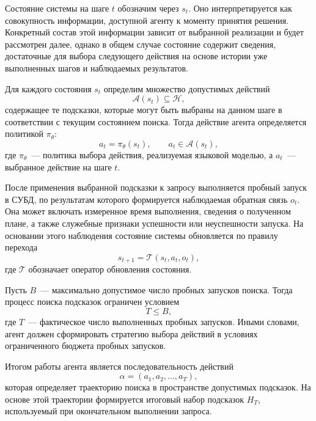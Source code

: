 Состояние системы на шаге $t$ обозначим через $s_t$. Оно интерпретируется как совокупность информации, доступной агенту к моменту принятия решения. Конкретный состав этой информации зависит от выбранной реализации и будет рассмотрен далее, однако в общем случае состояние содержит сведения, достаточные для выбора следующего действия на основе истории уже выполненных шагов и наблюдаемых результатов.

Для каждого состояния $s_t$ определим множество допустимых действий
\begin{equation}
    \label{eq:available_actions}
    \mathcal{A}(s_t) \subseteq \mathcal{H},
\end{equation}
содержащее те подсказки, которые могут быть выбраны на данном шаге в соответствии с текущим состоянием поиска. Тогда действие агента определяется политикой $\pi_\theta$:
\begin{equation}
    \label{eq:policy_action}
    a_t = \pi_\theta(s_t), \qquad a_t \in \mathcal{A}(s_t),
\end{equation}
где $\pi_\theta$~--- политика выбора действия, реализуемая языковой моделью, а $a_t$~--- выбранное действие на шаге $t$.

После применения выбранной подсказки к запросу выполняется пробный запуск в СУБД, по результатам которого формируется наблюдаемая обратная связь $o_t$. Она может включать измеренное время выполнения, сведения о полученном плане, а также служебные признаки успешности или неуспешности запуска. На основании этого наблюдения состояние системы обновляется по правилу перехода
\begin{equation}
    \label{eq:state_transition}
    s_{t+1} = \mathcal{T}(s_t, a_t, o_t),
\end{equation}
где $\mathcal{T}$ обозначает оператор обновления состояния.

Пусть $B$~--- максимально допустимое число пробных запусков поиска. Тогда процесс поиска подсказок ограничен условием
\begin{equation}
    \label{eq:budget_constraint}
    T \leq B,
\end{equation}
где $T$~--- фактическое число выполненных пробных запусков. Иными словами, агент должен сформировать стратегию выбора действий в условиях ограниченного бюджета пробных запусков.

Итогом работы агента является последовательность действий
\begin{equation}
    \label{eq:trajectory}
    \alpha = (a_1, a_2, \dots, a_T),
\end{equation}
которая определяет траекторию поиска в пространстве допустимых подсказок. На основе этой траектории формируется итоговый набор подсказок $H_T$, используемый при окончательном выполнении запроса.


